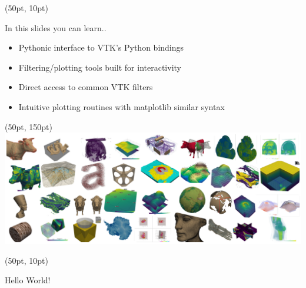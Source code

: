 \documentclass[aspectratio=169,12pt]{beamer}
\begin{document}
\begin{frame}[fragile]
\begin{textblock*}{800pt}(50pt, 10pt)
\begin{block}{In this slides you can learn.. }
\begin{itemize}
\item Pythonic interface to VTK’s Python bindings
\item Filtering/plotting tools built for interactivity
\item Direct access to common VTK filters
\item Intuitive plotting routines with matplotlib similar syntax
\end{itemize}
\end{block}
\end{textblock*}
\begin{textblock*}{800pt}(50pt, 150pt)
\includegraphics[width=0.50\linewidth]{pyvista_banner_small.png}
\end{textblock*}
\end{frame}
\begin{frame}[fragile]
\begin{textblock*}{350pt}(50pt, 10pt)
\begin{block}{Hello World!}

\end{block}
\end{textblock*}
\end{frame}
\end{document}
